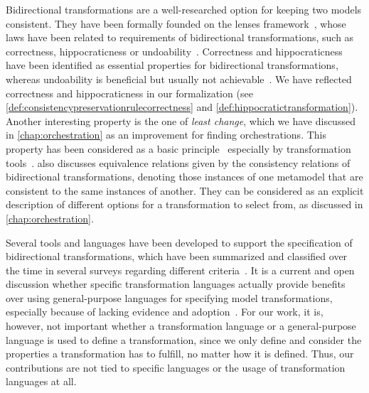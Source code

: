 Bidirectional transformations are a well-researched option for keeping two models consistent.
They have been formally founded on the lenses framework~\cite{stevens2008bxalgebraic-ICGT}, whose laws have been related to requirements of bidirectional transformations, such as correctness, hippocraticness or undoability~\cite{stevens2010sosym}.
Correctness and hippocraticness have been identified as essential properties for bidirectional transformations, whereas undoability is beneficial but usually not achievable~\cite{stevens2010sosym}.
We have reflected correctness and hippocraticness in our formalization (see \autoref{def:consistencypreservationrulecorrectness} and \autoref{def:hippocratictransformation}).
Another interesting property is the one of \emph{least change}, which we have discussed in \autoref{chap:orchestration} as an improvement for finding orchestrations.
This property has been considered as a basic principle~\cite{cheney2017LeastChangeBx-JOT} especially by transformation tools~\cite{macedo2016qvtAtlAlloy-SoSym}.
\textcite{stevens2012equivalences-EASST} also discusses equivalence relations given by the consistency relations of bidirectional transformations, denoting those instances of one metamodel that are consistent to the same instances of another.
They can be considered as an explicit description of different options for a transformation to select from, as discussed in \autoref{chap:orchestration}.

Several tools and languages have been developed to support the specification of bidirectional transformations, which have been summarized and classified over the time in several surveys regarding different criteria~\cite{stevens2008LandscapeBidirectionalTransformation-GTTSE, diRuscio2012transformations-SFM, kusel2013SurveyIncrementalTransformation-ME, jakumeit2014transformationTools-SCP, samimi-dehkordi2015bidirectionalSynchronization-ICCKE, samimi-dehkordi2016iccke,hidaka2016classificationTransformations-SoSym,kahani2019SurveyTransformationTools-SoSym}.
It is a current and open discussion whether specific transformation languages actually provide benefits over using general-purpose languages for specifying model transformations, especially because of lacking evidence and adoption~\cite{burgueno2019futureTransformationLanguages-ICMT}. 
For our work, it is, however, not important whether a transformation language or a general-purpose language is used to define a transformation, since we only define and consider the properties a transformation has to fulfill, no matter how it is defined.
Thus, our contributions are not tied to specific languages or the usage of transformation languages at all.

